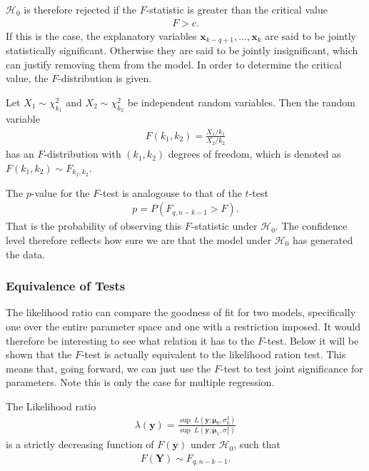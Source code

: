 $\mathcal{H}_0$ is therefore rejected if the $F$-statistic is greater than the critical value
\begin{align*}
    F>c.
\end{align*}
If this is the case, the explanatory variables $\textbf{x}_{k-q+1}, \ldots, \textbf{x}_k$ are said to be jointly statistically significant. 
Otherwise they are said to be jointly insignificant, which can justify removing them from the model. 
In order to determine the critical value, the $F$-distribution is given.
\begin{definition}[$F$-Distribution]\label{def:F-distribution}
    Let $X_1 \sim \chi_{k_1}^2$ and $X_2 \sim \chi_{k_2}^2$ be independent random variables. Then the random variable 
        \begin{align*}
            F(k_1,k_2) = \frac{X_1/k_1}{X_2/k_2}
        \end{align*}
    has an $F$-distribution with $(k_1, k_2)$ degrees of freedom, which is denoted as $F(k_1,k_2) \sim F_{k_1, k_2}$.
\end{definition}
The $p$-value for the $F$-test is analogouse to that of the $t$-test
\begin{align*}
    p = P(F_{q,n-k-1} > F).
\end{align*}
That is the probability of observing this $F$-statistic under $\mathcal{H}_0$. 
The confidence level therefore reflects how sure we are that the model under $\mathcal{H}_0$ has generated the data.

\subsubsection{Equivalence of Tests}
The likelihood ratio can compare the goodness of fit for two models, specifically one over the entire parameter space and one with a restriction imposed.
It would therefore be interesting to see what relation it has to the $F$-test. 
Below it will be shown that the $F$-test is actually equivalent to the likelihood ration test.
This means that, going forward, we can just use the $F$-test to test joint significance for parameters.
Note this is only the case for multiple regression. 

\begin{theorem}
\label{th:Likelihood_ratio_linear_models}
    The Likelihood ratio
    \begin{align*}
        \lambda(\textbf{y}) = \frac{\sup \ L(\textbf{y};\boldsymbol{\mu}_0, \sigma_0^2)}{\sup \ L(\textbf{y};\boldsymbol{\mu}_1, \sigma_1^2)}
    \end{align*}
    is a strictly decreasing function of $F(\textbf{y})$ under $\mathcal{H}_0$, such that
    \begin{align*}
        F(\textbf{Y}) \sim F_{q, n-k-1}.
    \end{align*}
\end{theorem}

